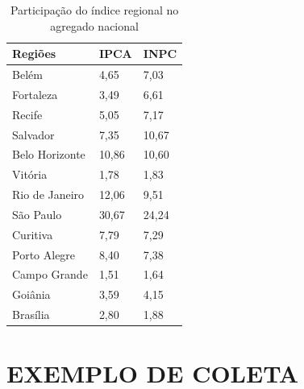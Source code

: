 \documentclass[twoside,a4paper,11pt]{report}
\begin{document}
{\begin{table}[h]
\centering
\begin{tabular}{lll}
\hline
\multicolumn{1}{l|}{Regiões} & \multicolumn{1}{l|}{IPCA} & INPC  \\ \hline
Belém                      & 4,65                      & 7,03  \\
Fortaleza                  & 3,49                      & 6,61  \\
Recife                     & 5,05                      & 7,17  \\
Salvador                   & 7,35                      & 10,67 \\
Belo Horizonte             & 10,86                     & 10,60 \\
Vitória                    & 1,78                      & 1,83  \\
Rio de Janeiro             & 12,06                     & 9,51  \\
São Paulo                  & 30,67                     & 24,24 \\
Curitiva                   & 7,79                      & 7,29  \\
Porto Alegre               & 8,40                      & 7,38  \\
Campo Grande               & 1,51                      & 1,64  \\
Goiânia                    & 3,59                      & 4,15  \\
Brasília                   & 2,80                      & 1,88  \\ \hline
\end{tabular}
\caption{Participação do índice regional no agregado nacional}
\label{tab02ap01}
\end{table}

\chapter{EXEMPLO DE COLETA}\label{ap2}

}
\end{document}
